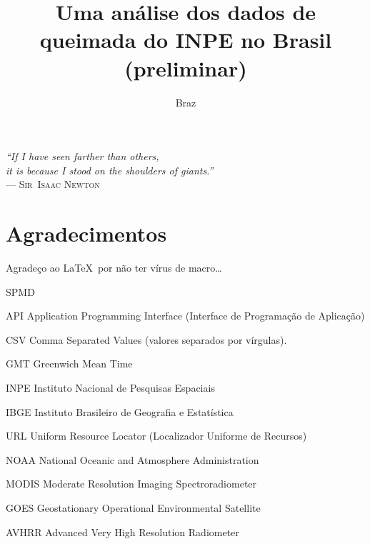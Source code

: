 \documentclass[cic,tc]{iiufrgs}
\title{Uma análise dos dados de queimada do INPE no Brasil (preliminar)}
\author{Braz}{José Henrique da Silva}
\begin{document}
\maketitle

\clearpage
\begin{flushright}
\mbox{}\vfill
{\sffamily\itshape
``If I have seen farther than others,\\
it is because I stood on the shoulders of giants.''\\}
--- \textsc{Sir~Isaac Newton}
\end{flushright}

\chapter*{Agradecimentos}
Agradeço ao \LaTeX\ por não ter vírus de macro\ldots

\tableofcontents

\begin{listofabbrv}{SPMD}
	\item[API] Application Programming Interface (Interface de Programação de Aplicação)
	\item[CSV] Comma Separated Values (valores separados por vírgulas).
    \item[GMT] Greenwich Mean Time
    \item[INPE] Instituto Nacional de Pesquisas Espaciais
    \item[IBGE] Instituto Brasileiro de Geografia e Estatística
    \item[URL] Uniform Resource Locator (Localizador Uniforme de Recursos)
    \item[NOAA] National Oceanic and Atmosphere Administration
    \item[MODIS] Moderate Resolution Imaging Spectroradiometer
    \item[GOES] Geostationary Operational Environmental Satellite
    \item[AVHRR] Advanced Very High Resolution Radiometer
\end{listofabbrv}

\end{document}
